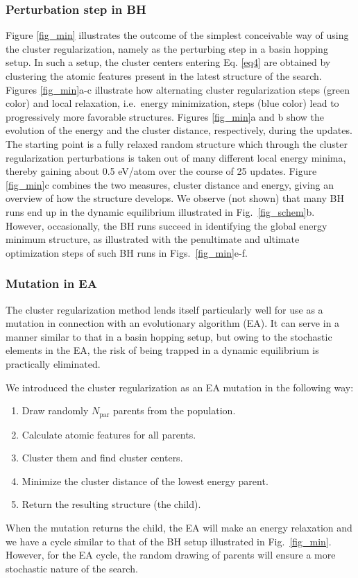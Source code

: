 \documentclass[aip,amsmath,amssymb,reprint]{revtex4-1}
\begin{document}
\subsubsection{Perturbation step in BH}
Figure \ref{fig_min} illustrates the outcome of the simplest
conceivable way of using the cluster regularization, namely as the
perturbing step in a basin hopping setup. In such a setup, the cluster
centers entering Eq. \ref{eq4} are obtained by clustering the
atomic features present in the latest structure of the search. Figures
\ref{fig_min}a-c illustrate how alternating cluster regularization
steps (green color) and local relaxation, i.e.\ energy minimization,
steps (blue color) lead to progressively more favorable
structures. Figures \ref{fig_min}a and b show the evolution of the
energy and the cluster distance, respectively, during the updates. The
starting point is a fully relaxed random structure which through the
cluster regularization perturbations is taken out of many different
local energy minima, thereby gaining about 0.5 eV/atom over the course of
25 updates. Figure \ref{fig_min}c combines the two measures, cluster
distance and energy, giving an overview of how the structure
develops. We observe (not shown) that many BH runs end up in the dynamic
equilibrium illustrated in Fig.\  \ref{fig_schem}b. However, occasionally, the BH runs succeed in
identifying the global energy minimum structure, as illustrated with
the penultimate and ultimate optimization steps of such BH runs in
Figs.\  \ref{fig_min}e-f.

\subsubsection{Mutation in EA}
The cluster regularization method lends itself particularly well for
use as a mutation in connection with an evolutionary algorithm (EA). It can
serve in a manner similar to that in a basin hopping setup, but owing
to the stochastic elements in the EA, the risk of being trapped in a
dynamic equilibrium is practically eliminated.

We introduced the cluster regularization as an EA mutation in the following way:
\begin{enumerate}
\item Draw randomly $N_\mathrm{par}$ parents from the population.
\item Calculate atomic features for all parents.
\item Cluster them and find cluster centers.
\item Minimize the cluster distance of the lowest energy parent.
\item Return the resulting structure (the child).
\end{enumerate}
When the mutation returns the child, the EA will make an energy
relaxation and we have a cycle similar to that of the BH setup
illustrated in Fig.\  \ref{fig_min}. However, for the EA cycle, the
random drawing of parents will ensure a more stochastic nature of the
search.
\end{document}
